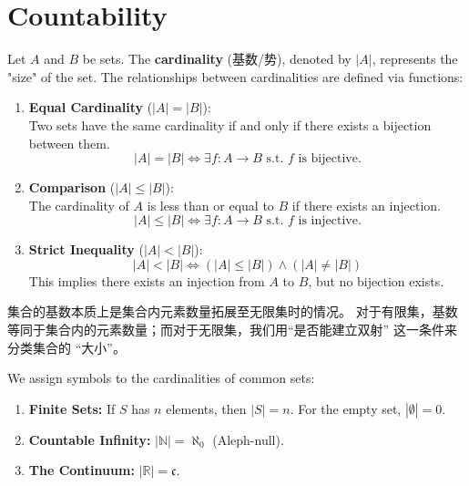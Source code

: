 \documentclass[
	UTF-8,
	11pt, %
	a4paper, %
]{LegrandOrangeBook}
\begin{document}
    \newpage

    \section{Countability}

    
    \begin{definition}[Cardinality]
    Let $A$ and $B$ be sets. The \textbf{cardinality} (基数/势), denoted by $|A|$, 
    represents the "size" of the set. 
    The relationships between cardinalities are defined via functions:

    \begin{enumerate}
        \item \textbf{Equal Cardinality} ($|A| = |B|$): \\
        Two sets have the same cardinality if and only if there exists a bijection between them.
        \[ |A| = |B| \iff \exists f: A \to B \text{ s.t. } f \text{ is bijective.} \]
        
        \item \textbf{Comparison} ($|A| \le |B|$): \\
        The cardinality of $A$ is less than or equal to $B$ if there exists an injection.
        \[ |A| \le |B| \iff \exists f: A \to B \text{ s.t. } f \text{ is injective.} \]
        
        \item \textbf{Strict Inequality} ($|A| < |B|$): \\
        \[ |A| < |B| \iff (|A| \le |B|) \land (|A| \neq |B|) \]
        This implies there exists an injection from $A$ to $B$, but no bijection exists.
    \end{enumerate}
    \end{definition}

    \begin{remark}
        集合的基数本质上是集合内元素数量拓展至无限集时的情况。
        对于有限集，基数等同于集合内的元素数量；而对于无限集，我们用“是否能建立双射”
        这一条件来分类集合的 “大小”。
    \end{remark}

    \begin{remark}
    We assign symbols to the cardinalities of common sets:
    \begin{enumerate}
        \item \textbf{Finite Sets:} If $S$ has $n$ elements, then $|S| = n$. For the empty set, $|\emptyset| = 0$.
        \item \textbf{Countable Infinity:} $|\mathbb{N}| = \aleph_0$ (Aleph-null).
        \item \textbf{The Continuum:} $|\mathbb{R}| = \mathfrak{c}$.
    \end{enumerate}
    \end{remark}
\end{document}
